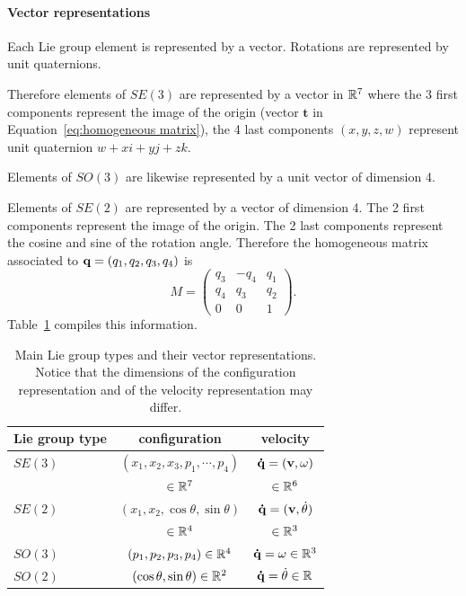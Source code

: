 \paragraph{Vector representations}
Each Lie group element is represented by a vector. Rotations are represented by
unit quaternions.

Therefore elements of $SE(3)$ are represented by a vector in $\mathbb{R}^7$ where the 3 first components represent the image of the origin (vector $\mathbf{t}$ in Equation~\ref{eq:homogeneous matrix}), the 4 last components $(x,y,z,w)$ represent unit quaternion $w + x {i} + y {j} + z {k}$.

Elements of $SO(3)$ are likewise represented by a unit vector of dimension 4.

Elements of $SE(2)$ are represented by a vector of dimension 4. The 2 first components represent the image of the origin. The 2 last components represent the cosine and sine of the rotation angle. Therefore the homogeneous matrix associated to $\mathbf{q}=(q_1,q_2,q_3,q_4)$ is
$$
M = \left(\begin{array}{lll}
  q_3 & -q_4 & q_1 \\
  q_4 &  q_3 & q_2 \\
  0   &  0  & 1
\end{array}\right).
$$
Table~\ref{tab:vector representation} compiles this information.
\begin{table}
  \begin{tabular}{|l|c|c|}
    \hline
    Lie group type & configuration & velocity\\
    \hline
    $SE(3)$ & $(x_1,x_2,x_3,p_1,\cdots,p_4)$ & $\mathbf{\dot{q}}=(\mathbf{v},\omega)$ \\
            & $\in\mathbb{R}^7$                 & $\in\mathbb{R}^6$ \\
    $SE(2)$ & $(x_1,x_2,\cos\theta,\sin\theta)$ & $\mathbf{\dot{q}}=(\mathbf{v},\dot{\theta})$\\
            & $\in\mathbb{R}^4$                 & $\in\mathbb{R}^3$ \\
    $SO(3)$ & $(p_1,p_2,p_3,p_4)\in\mathbb{R}^4$ & $\mathbf{\dot{q}}=\omega\in\mathbb{R}^3$\\
    $SO(2)$ & $(\cos\theta,\sin\theta)\in\mathbb{R}^2$ & $\mathbf{\dot{q}}=\dot{\theta}\in\mathbb{R}$\\
    \hline
  \end{tabular}
  \caption{Main Lie group types and their vector representations. Notice that the dimensions of the configuration representation and of the velocity representation may differ.}
  \label{tab:vector representation}
\end{table}

